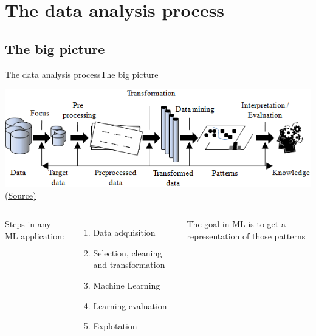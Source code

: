 \documentclass[10pt,compress]{beamer} %
\begin{document}
\section{The data analysis process}
\subsection{The big picture}
\begin{frame}{The data analysis process}{The big picture}
	\begin{center}
	\includegraphics[width=0.8\linewidth]{figs/kdd.png}\\
    \tiny{\href{https://www.researchgate.net/figure/The-steps-of-the-KDD-process_fig6_297734487}{(Source)}}
	\end{center}

	\begin{columns}
		Steps in any ML application:
		\begin{enumerate}
			\item Data adquisition
			\item Selection, cleaning and transformation
			\item Machine Learning
			\item Learning evaluation
			\item Explotation
		\end{enumerate}

	   \begin{block}{}
	   		The goal in ML is to get a representation of those patterns
	   \end{block}
	\end{columns}
\end{frame}
\end{document}
